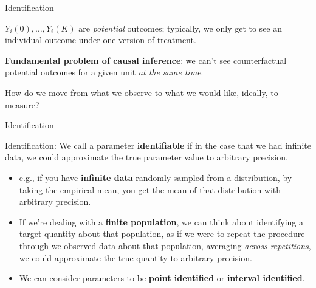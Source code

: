 \documentclass[xcolor={dvipsnames}, handout]{beamer}
\begin{document}

\begin{frame}{Identification}

\begin{wideitemize}
\item $Y_i(0), \dots, Y_i(K)$ are \textit{potential} outcomes\pause; typically, we only get to see an individual outcome under one version of treatment. \pause
\item \textbf{Fundamental problem of causal inference}: we can't see counterfactual potential outcomes for a given unit \textit{at the same time}.\pause
\item How do we move from what we observe to what we would like, ideally, to measure? 
\end{wideitemize}

\end{frame}



\begin{frame}{Identification}

\begin{wideitemize}
\item Identification: We call a parameter \textbf{identifiable} if in the case that we had infinite data, we could approximate the true parameter value to arbitrary precision. \pause
\begin{itemize}
\item e.g., if you have \textbf{infinite data} randomly sampled from a distribution, by taking the empirical mean, you get the mean of that distribution with arbitrary precision.\pause
\item If we're dealing with a \textbf{finite population}, we can think about identifying a target quantity about that population, as if we were to repeat the procedure through we observed data about that population, averaging \textit{across repetitions}, we could approximate the true quantity to arbitrary precision.\pause
\item We can consider parameters to be \textbf{point identified} or \textbf{interval identified}. 
\end{itemize}
\end{wideitemize}

\end{frame}
\end{document}
